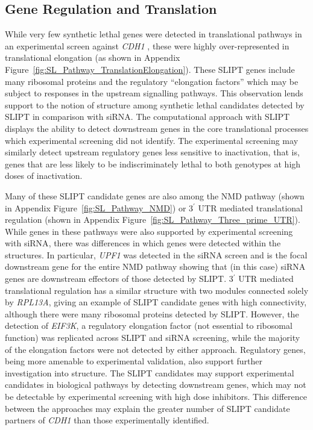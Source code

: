 \FloatBarrier

\subsection{Gene Regulation and Translation}  \label{chapt4:SL_Genes_Translation}

While very few \gls{synthetic lethal} genes were detected in translational pathways in an experimental screen against \textit{CDH1} \citep{Telford2015}, these were highly over-represented in translational elongation (as shown in Appendix Figure~\ref{fig:SL_Pathway_TranslationElongation}). These \gls{SLIPT} genes include many ribosomal proteins and the regulatory ``elongation factors'' which may be subject to responses in the upstream signalling pathways. This observation lends support to the notion of  structure among \gls{synthetic lethal} candidates detected by \gls{SLIPT} in comparison with \gls{siRNA}. The computational approach with \gls{SLIPT} displays the ability to detect downstream genes in the core translational processes which experimental screening did not identify. The experimental screening may similarly detect upstream regulatory genes less sensitive to inactivation, that is, genes that are less likely to be indiscriminately lethal to both genotypes at high doses of inactivation.

Many of these \gls{SLIPT} candidate genes are also among the \gls{NMD} pathway (shown in Appendix Figure~\ref{fig:SL_Pathway_NMD}) or 3$^\prime$ \gls{UTR} mediated translational regulation (shown in Appendix Figure~\ref{fig:SL_Pathway_Three_prime_UTR}). While genes in these pathways were also supported by experimental screening with \gls{siRNA}, there was differences in which genes were detected within the  structures. In particular, \textit{UPF1} was detected in the \gls{siRNA} screen and is the focal downstream gene for the entire \gls{NMD} pathway showing that (in this case) \gls{siRNA} genes are downstream effectors of those detected by \gls{SLIPT}.  3$^\prime$ \gls{UTR} mediated translational regulation has a similar structure with two modules connected solely by \textit{RPL13A}, giving an example of \gls{SLIPT} candidate genes with high connectivity, although there were many ribosomal proteins detected by \gls{SLIPT}. However, the detection of \textit{EIF3K}, a regulatory elongation factor (not \gls{essential} to ribosomal function) was replicated across \gls{SLIPT} and \gls{siRNA} screening, while the majority of the elongation factors were not detected by either approach. Regulatory genes, being more amenable to experimental validation, also support further investigation into  structure. The \gls{SLIPT} candidates may support experimental candidates in biological pathways by detecting downstream genes, which may not be detectable by experimental screening with high dose inhibitors. This difference between the approaches may explain the greater number of \gls{SLIPT} candidate partners of \textit{CDH1} than those experimentally identified.


